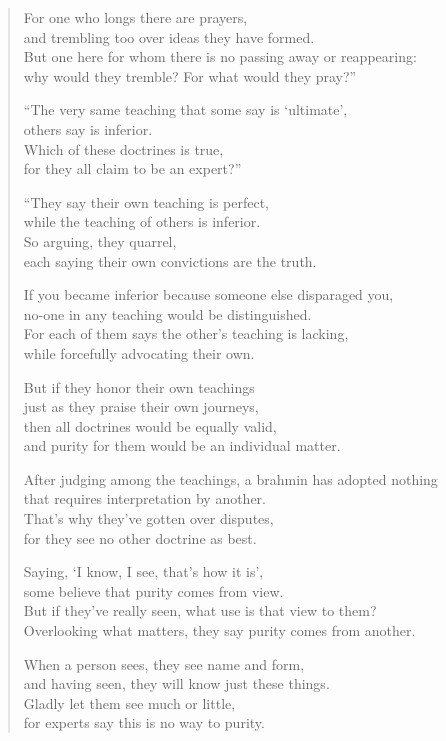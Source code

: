 \documentclass[12pt,openany]{book}%
\begin{document}
\begin{verse}
For one who longs there are prayers, \\
and trembling too over ideas they have formed. \\
But one here for whom there is no passing away or reappearing: \\
why would they tremble? For what would they pray?” 

“The very same teaching that some say is ‘ultimate’, \\
others say is inferior. \\
Which of these doctrines is true, \\
for they all claim to be an expert?” 

“They say their own teaching is perfect, \\
while the teaching of others is inferior. \\
So arguing, they quarrel, \\
each saying their own convictions are the truth. 

If you became inferior because someone else disparaged you, \\
no-one in any teaching would be distinguished. \\
For each of them says the other’s teaching is lacking, \\
while forcefully advocating their own. 

But if they honor their own teachings \\
just as they praise their own journeys, \\
then all doctrines would be equally valid, \\
and purity for them would be an individual matter. 

After judging among the teachings, a brahmin has adopted nothing \\
that requires interpretation by another. \\
That’s why they’ve gotten over disputes, \\
for they see no other doctrine as best. 

Saying, ‘I know, I see, that’s how it is’, \\
some believe that purity comes from view. \\
But if they’ve really seen, what use is that view to them? \\
Overlooking what matters, they say purity comes from another. 

When a person sees, they see name and form, \\
and having seen, they will know just these things. \\
Gladly let them see much or little, \\
for experts say this is no way to purity. 


\end{verse}
\end{document}
